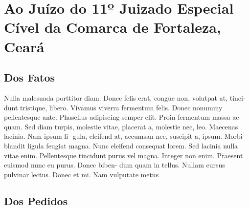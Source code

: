 \documentclass[
  12pt,
	oneside,
	a4paper,
	english,			%
	french,				%
	spanish,			%
  brazil
]{memoir}
\begin{document}
  \AddToShipoutPicture{\BackgroundPic}

\chapter{Ao Juízo do 11º Juizado Especial Cível da Comarca de Fortaleza, Ceará}

\lipsum[1]

\section{Dos Fatos}
\lipsum[1]

\begin{citacao}
Nulla malesuada porttitor diam. Donec felis erat, congue non, volutpat at,
tinci- dunt tristique, libero. Vivamus viverra fermentum felis. Donec nonummy
pellentesque ante. Phasellus adipiscing semper elit. Proin fermentum massa ac
quam. Sed diam turpis, molestie vitae, placerat a, molestie nec, leo. Maecenas
lacinia. Nam ipsum li- gula, eleifend at, accumsan nec, suscipit a, ipsum.
Morbi blandit ligula feugiat magna.  Nunc eleifend consequat lorem. Sed lacinia
nulla vitae enim. Pellentesque tincidunt purus vel magna. Integer non enim.
Praesent euismod nunc eu purus. Donec biben- dum quam in tellus. Nullam cursus
pulvinar lectus. Donec et mi. Nam vulputate metus  
\end{citacao}

\lipsum[1-2]

\section{Dos Pedidos}
\lipsum[1-3]

\hoje{}
\end{document}
